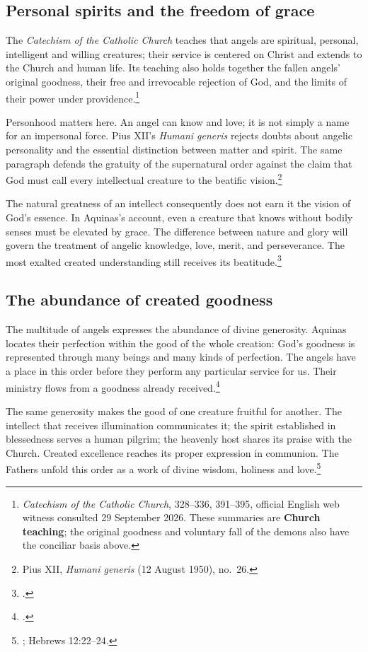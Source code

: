 \subsection{Personal spirits and the freedom of grace}

The \emph{Catechism of the Catholic Church} teaches that angels are
spiritual, personal, intelligent and willing creatures; their service is
centered on Christ and extends to the Church and human life. Its teaching
also holds together the fallen angels' original goodness, their free and
irrevocable rejection of God, and the limits of their power under
providence.\footnote{\emph{Catechism of the Catholic Church},
328--336, 391--395, official English web witness consulted 29 September
2026. These summaries are \textbf{Church teaching}; the original goodness
and voluntary fall of the demons also have the conciliar basis above.}

Personhood matters here. An angel can know and love; it is not simply a
name for an impersonal force. Pius XII's \emph{Humani generis} rejects
doubts about angelic personality and the essential distinction between
matter and spirit. The same paragraph defends the gratuity of the
supernatural order against the claim that God must call every intellectual
creature to the beatific vision.\footnote{Pius XII, \emph{Humani generis}
(12 August 1950), no.~26.}

The natural greatness of an intellect consequently does not earn it the
vision of God's essence. In Aquinas's account, even a creature that knows
without bodily senses must be elevated by grace. The difference between
nature and glory will govern the treatment of angelic knowledge, love,
merit, and perseverance. The most exalted created understanding still
receives its beatitude.\footnote{.}

\subsection{The abundance of created goodness}

The multitude of angels expresses the abundance of divine generosity.
Aquinas locates their perfection within the good of the whole creation:
God's goodness is represented through many beings and many kinds of
perfection. The angels have a place in this order before they perform
any particular service for us. Their ministry flows from a goodness
already received.\footnote{.}

The same generosity makes the good of one creature fruitful for another.
The intellect that receives illumination communicates it; the spirit
established in blessedness serves a human pilgrim; the heavenly host
shares its praise with the Church. Created excellence reaches its proper
expression in communion. The Fathers unfold this order as a work of
divine wisdom, holiness and love.\footnote{; Hebrews 12:22--24.}
